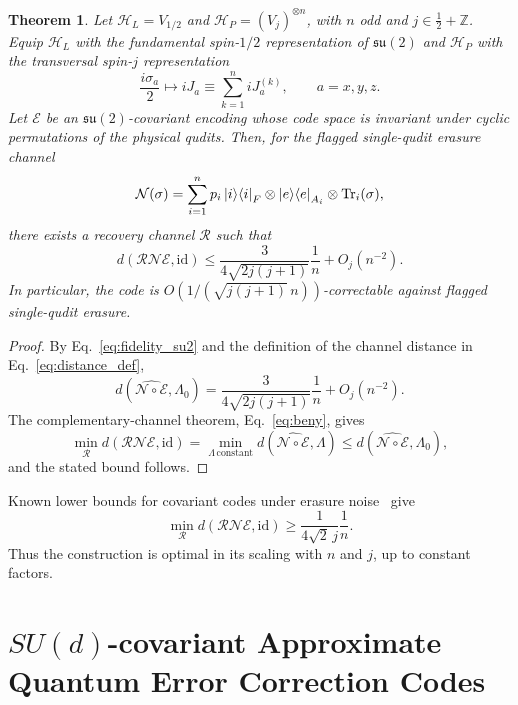 \documentclass[10pt,twocolumn,superscriptaddress,aps,amsmath,amssymb,citeautoscript,floatfix,prx]{revtex4-2}
\newtheorem{theorem}{Theorem}
\theoremstyle{plain}
\theoremstyle{plain}
\theoremstyle{plain}
\theoremstyle{plain}
\theoremstyle{plain}
\theoremstyle{plain}
\theoremstyle{plain}
\theoremstyle{definition}
\theoremstyle{plain}
\begin{document}
\begin{theorem}\label{thrm:su2scale}
Let $\mathcal H_L=V_{1/2}$ and $\mathcal H_P=(V_j)^{\otimes n}$, with $n$ odd and $j\in\frac12+\mathbb Z$. Equip $\mathcal H_L$ with the fundamental spin-$1/2$ 
representation of $\mathfrak{su}(2)$ and $\mathcal H_P$ with the transversal spin-$j$ representation
\begin{equation}
    \frac{i\sigma_a}{2}
    \longmapsto
    iJ_a
    \equiv
    \sum_{k=1}^n iJ_a^{(k)},
    \qquad a=x,y,z .
\end{equation}
Let $\mathcal E$ be an $\mathfrak{su}(2)$-covariant encoding whose code space is invariant under cyclic permutations of the physical qudits. 
Then, for the flagged single-qudit erasure channel
\[
    \mathcal N(\sigma)
    =
    \sum_{i=1}^n p_i\ket i\!\bra i_F
    \otimes \ket e\!\bra e_{A_i}
    \otimes \operatorname{Tr}_i(\sigma),
\]
there exists a recovery channel $\mathcal R$ such that
\[
    d(\mathcal R\mathcal N\mathcal E,\mathrm{id})
    \le
    \frac{3}{4\sqrt{2j(j+1)}}\frac{1}{n}
    +O_{j}(n^{-2}) .
\]
In particular, the code is $O\!\left(1/(\sqrt{j(j+1)}\,n)\right)$-correctable against flagged single-qudit erasure.
\end{theorem}

\begin{proof}
By Eq.~\eqref{eq:fidelity_su2} and the definition of the channel distance in Eq.~\eqref{eq:distance_def},
\[
    d\!\left(\widehat{\mathcal N\circ\mathcal E},\Lambda_0\right)
    =
    \frac{3}{4\sqrt{2j(j+1)}}\frac{1}{n}
    +O_{j}(n^{-2}) .
\]
The complementary-channel theorem, Eq.~\eqref{eq:beny}, gives
\[
    \min_{\mathcal R}
    d(\mathcal R\mathcal N\mathcal E,\mathrm{id})
    =
    \min_{\Lambda\,\mathrm{constant}}
    d\!\left(\widehat{\mathcal N\circ\mathcal E},\Lambda\right)
    \le
    d\!\left(\widehat{\mathcal N\circ\mathcal E},\Lambda_0\right),
\]
and the stated bound follows.
\end{proof}

Known lower bounds for covariant codes under erasure noise~\cite{Faist2020} give
\[
    \min_{\mathcal R}
    d(\mathcal R\mathcal N\mathcal E,\mathrm{id})
    \ge
    \frac{1}{4\sqrt{2}\,j}\frac{1}{n} .
\]
Thus the construction is optimal in its scaling with $n$ and $j$, up to constant factors.


\section{\texorpdfstring{$SU(d)$}{SU(d)}-covariant Approximate Quantum Error Correction Codes}\label{sec:main_sud}
\end{document}
